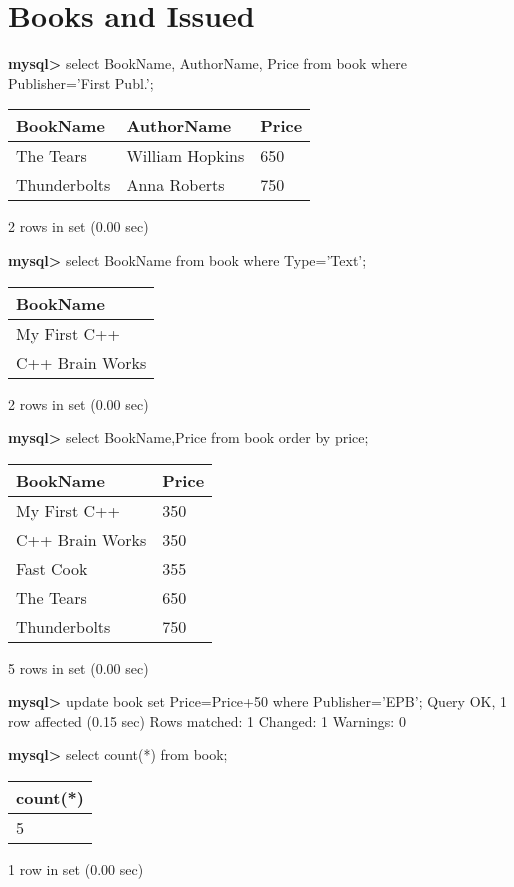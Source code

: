\documentclass[11pt]{article}
\begin{document}
\section{Books and Issued}
\label{sec:orgc321d10}
\textbf{mysql>} select BookName, AuthorName, Price from book where Publisher='First Publ.';
\begin{center}
\begin{tabular}{|l|l|l|}
\hline
BookName & AuthorName & Price \\
\hline
The Tears & William Hopkins & 650 \\
Thunderbolts & Anna Roberts & 750 \\
\hline
\end{tabular}
\end{center}
2 rows in set (0.00 sec)

\textbf{mysql>} select BookName from book where Type='Text';
\begin{center}
\begin{tabular}{|l|}
\hline
BookName \\
\hline
My First C++ \\
C++ Brain Works \\
\hline
\end{tabular}
\end{center}
2 rows in set (0.00 sec)

\textbf{mysql>} select BookName,Price from book order by price;
\begin{center}
\begin{tabular}{|l|l|}
\hline
BookName & Price \\
\hline
My First C++ & 350 \\
C++ Brain Works & 350 \\
Fast Cook & 355 \\
The Tears & 650 \\
Thunderbolts & 750 \\
\hline
\end{tabular}
\end{center}
5 rows in set (0.00 sec)

\textbf{mysql>} update book set Price=Price+50 where Publisher='EPB';
Query OK, 1 row affected (0.15 sec)
Rows matched: 1  Changed: 1  Warnings: 0

\textbf{mysql>} select count(*) from book;
\begin{center}
\begin{tabular}{|l|}
\hline
count(*) \\
\hline
5 \\
\hline
\end{tabular}
\end{center}
1 row in set (0.00 sec)
\end{document}
